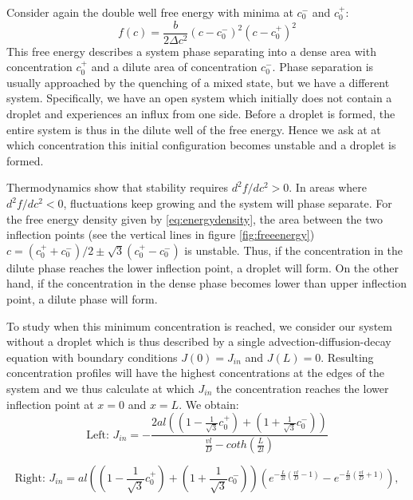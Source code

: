 \documentclass{Dissertate}
\begin{document}
Consider again the double well free energy with minima at \(c_0^-\) and
\(c_0^+\): \begin{equation}
f(c) = \frac{b}{2\Delta c^2}(c-c_0^-)^2(c-c_0^+)^2
\label{eq:energydensity}\end{equation} This free energy describes a
system phase separating into a dense area with concentration \(c_0^+\)
and a dilute area of concentration \(c_0^-\). Phase separation is usually approached by the quenching of a mixed state, but we have a different system. Specifically, we have an open system which initially does not contain a droplet and experiences an influx from one side. Before a droplet is formed, the entire system is thus in the dilute well of the free energy. Hence we ask at
 at which concentration this initial configuration becomes unstable and a droplet is formed.
 
Thermodynamics show that stability requires \(d^2f/dc^2>0\). In areas where \(d^2f/dc^2<0\), fluctuations keep growing and the system will phase separate. For the free energy density
given by \ref{eq:energydensity}, the area between the two inflection
points (see the vertical lines in figure \ref{fig:freeenergy}) \(c=(c_0^++c_0^-)/2\pm\sqrt{3}(c_0^+-c_0^-)\) is unstable. Thus,
if the concentration in the dilute phase reaches the lower inflection point, a droplet will form. On the other hand, if the concentration in the dense phase becomes lower than upper inflection point, a dilute phase will form.  


To study when this minimum concentration is reached, we consider our
system without a droplet which is thus described by a single
advection-diffusion-decay equation with boundary conditions
\(J(0)=J_{in}\) and \(J(L)=0\). Resulting concentration profiles will
have the highest concentrations at the edges of the system and we thus calculate at
which \(J_{in}\) the concentration reaches the lower inflection point at $x=0$ and $x=L$.
We obtain: 
\begin{equation}
\text{Left:  }J_{in} = - \frac{ 2al((1-\frac{1}{\sqrt{3}}c_0^+)+(1+\frac{1}{\sqrt{3}}c_0^-))}{\frac{vl}{D}-coth(\frac{L}{2l})}
\label{eq:jminleft}
\end{equation}

\begin{equation}
\text{Right: } J_{in} =al((1-\frac{1}{\sqrt{3}}c_0^+)+(1+\frac{1}{\sqrt{3}}c_0^-))\left(e^{-\frac{L}{2l}(\frac{vl}{D}-1)}-e^{-\frac{L}{2l}(\frac{vl}{D}+1)}\right),
\label{eq:jminright}
\end{equation}
\end{document}
